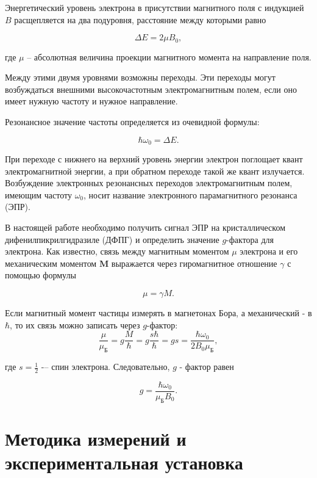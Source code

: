 \documentclass[a4paper, 12pt]{article}
\begin{document}
    Энергетический уровень электрона в присутствии магнитного поля с индукцией $B$ расщепляется на два подуровня, расстояние между которыми равно

    \begin{equation}
        \Delta E = 2\mu B_0,
        \label{eq:frequency_value}
    \end{equation}

    где $\mu$ -- абсолютная величина проекции магнитного момента на направление поля.

    Между этими двумя уровнями возможны переходы. Эти переходы могут возбуждаться внешними высокочастотным электромагнитным полем, если оно имеет нужную частоту и нужное направление.

    Резонансное значение частоты определяется из очевидной формулы:

    $$
    \hbar \omega_0 = \Delta E.
    $$

    При переходе с нижнего на верхний уровень энергии электрон поглощает квант электромагнитной энергии, а при обратном переходе такой же квант излучается. Возбуждение электронных резонансных переходов электромагнитным полем, имеющим частоту $\omega_0$, носит название электронного парамагнитного резонанса (ЭПР).
    
    В настоящей работе необходимо получить сигнал ЭПР на кристаллическом дифенилпикрилгидразиле (ДФПГ) и определить значение $g$-фактора для электрона. Как известно, связь между магнитным моментом $\mu$ электрона и его механическим моментом $\mathbf{M}$ выражается через гиромагнитное отношение $\gamma$ с помощью формулы

    $$
    \mu = \gamma M.
    $$
    
    Если магнитный момент частицы измерять в магнетонах Бора, а механический - в $\hbar$, то их связь можно записать через $g$-фактор:
    $$
    \frac{\mu}{\mu_\text{Б}} = g \frac{M}{\hbar} = g \frac{s \hbar}{\hbar} = gs = \frac{\hbar \omega_0}{2 B_0 \mu_\text{Б}},
    $$
    
    где $s = \frac{1}{2}$ -– спин электрона. Следовательно, $g$ - фактор равен

    $$
    g = \frac{\hbar \omega_0}{\mu_\text{Б} B_0}.
    $$
    
    \newpage
    
    \section{Методика измерений и экспериментальная установка}
\end{document}
